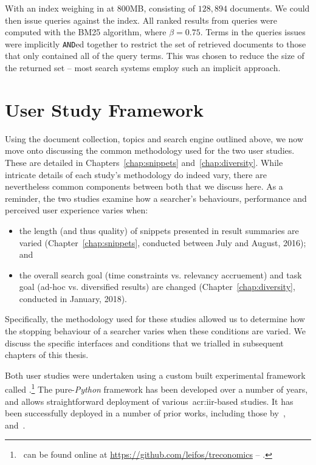 With an index weighing in at 800MB, consisting of $128,894$ documents.  We could then issue queries against the index. All ranked results from queries were computed with the BM25 algorithm, where $\beta=0.75$. Terms in the queries issues were implicitly \texttt{AND}ed together to restrict the set of retrieved documents to those that only contained all of the query terms. This was chosen to reduce the size of the returned set -- most search systems employ such an implicit approach.

\section{User Study Framework}\label{sec:method:user_study}
Using the document collection, topics and search engine outlined above, we now move onto discussing the common methodology used for the two user studies. These are detailed in Chapters~\ref{chap:snippets} and~\ref{chap:diversity}. While intricate details of each study's methodology do indeed vary, there are nevertheless common components between both that we discuss here. As a reminder, the two studies examine how a searcher's behaviours, performance and perceived user experience varies when:

\begin{itemize}
    \item{the length (and thus quality) of snippets presented in result summaries are varied (Chapter~\ref{chap:snippets}, conducted between July and August, 2016); and}
    
    \item{the overall search goal (time constraints vs. relevancy accruement) and task goal (ad-hoc vs. diversified results) are changed (Chapter~\ref{chap:diversity}, conducted in January, 2018).}
\end{itemize}

Specifically, the methodology used for these studies allowed us to determine how the stopping behaviour of a searcher varies when these conditions are varied. We discuss the specific interfaces and conditions that we trialled in subsequent chapters of this thesis.

Both user studies were undertaken using a custom built experimental framework called .\footnote{\treconomics~can be found online at \url{https://github.com/leifos/treconomics} -- .} The pure-\emph{Python} framework has been developed over a number of years, and allows straightforward deployment of various~\gls{acr:iir}-based studies. It has been successfully deployed in a number of prior works, including those by~\cite{azzopardi2013query_cost},~\cite{maxwell2014temporal_delays} and~\cite{kelly2015serp_size}.

